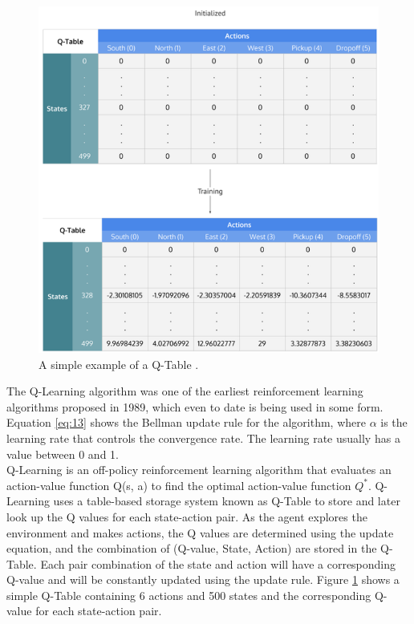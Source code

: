 \begin{figure}[h!]
    \centering
    \includegraphics[width=\textwidth]{images/Q-Table.png}
    \caption{A simple example of a Q-Table \cite{wiki}.}
    \label{fig:QT}
\end{figure}

The Q-Learning algorithm \cite{QL} was one of the earliest reinforcement learning algorithms proposed in 1989, which even to date is being used in some form. Equation \ref{eq:13} shows the Bellman update rule for the algorithm, where $\alpha$ is the learning rate that controls the convergence rate. The learning rate usually has a value between 0 and 1. \\

Q-Learning is an off-policy reinforcement learning algorithm that evaluates an action-value function Q(s, a) to find the optimal action-value function $Q^{*}$. Q-Learning uses a table-based storage system known as Q-Table to store and later look up the Q values for each state-action pair. As the agent explores the environment and makes actions, the Q values are determined using the update equation, and the combination of (Q-value, State, Action) are stored in the Q-Table. Each pair combination of the state and action will have a corresponding Q-value and will be constantly updated using the update rule. Figure \ref{fig:QT} shows a simple Q-Table containing 6 actions and 500 states and the corresponding Q-value for each state-action pair. \\

